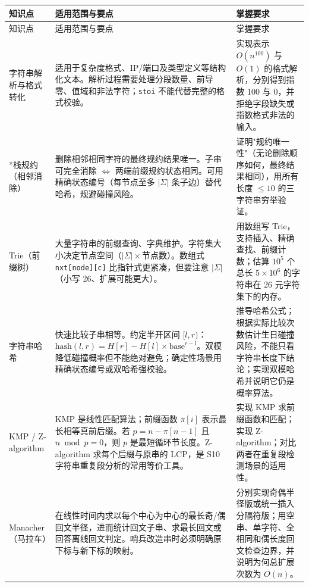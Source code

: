 \documentclass[a4paper,11pt]{article}
\newcommand{\code}[1]{\texttt{#1}}
\begin{document}
\begin{longtable}{L{2.4cm} L{7.5cm} L{6.8cm}}
\toprule
知识点 & 适用范围与要点 & 掌握要求 \\
\midrule
\endfirsthead
\toprule
知识点 & 适用范围与要点 & 掌握要求 \\
\midrule
\endhead
\endfoot
\bottomrule
\endlastfoot

字符串解析与格式转化
& 适用于复杂度格式、IP/端口及类型定义等结构化文本。解析过程需要处理分段数量、前导零、值域和非法字符；\code{stoi} 不能代替完整的格式校验。
& 实现表示 $O(n^{100})$ 与 $O(1)$ 的格式解析，分别得到指数 100 与 0，并拒绝字段缺失或指数格式非法的输入。\\[2mm]

*栈规约（相邻消除）
& 删除相邻相同字符的最终规约结果唯一。子串可完全消除 $\iff$ 两端前缀规约状态相同。可用精确状态编号（每节点至多 $|\Sigma|$ 条子边）替代哈希，规避碰撞风险。
& 证明"规约唯一性"（无论删除顺序如何，最终结果相同），用所有长度 $\le10$ 的三字符串穷举验证。\\[2mm]

Trie（前缀树）
& 大量字符串的前缀查询、字典维护。字符集大小决定节点空间（$|\Sigma|\times$节点数）。数组式 \code{nxt[node][c]} 比指针式更紧凑，但要注意 $|\Sigma|$（小写 26、扩展可能更大）。
& 用数组写 Trie，支持插入、精确查找、前缀计数；估算 $10^5$ 个总长 $5\times10^6$ 的字符串在 26 元字符集下的内存。\\[2mm]

字符串哈希
& 快速比较子串相等。约定半开区间 $[l,r)$：$\text{hash}(l,r)=H[r]-H[l]\times\text{base}^{r-l}$。双模降低碰撞概率但不能绝对避免；确定性场景用精确状态编号或双哈希强校验。
& 推导哈希公式；根据实际比较次数估计生日碰撞风险，不能只看字符串长度下结论；实现双模哈希并说明它仍是概率算法。\\[2mm]

KMP / Z-algorithm
& KMP 是线性匹配算法；前缀函数 $\pi[i]$ 表示最长相等真前后缀。若 $p=n-\pi[n-1]$ 且 $n\bmod p=0$，则 $p$ 是最短循环节长度。Z-algorithm 求每个后缀与原串的 LCP，是 S10 字符串重复段分析的常用等价工具。
& 实现 KMP 求前缀函数和匹配；实现 Z-algorithm；对比两者在重复段检测场景的适用性。\\[2mm]

Manacher（马拉车）
& 在线性时间内求以每个中心为中心的最长奇/偶回文半径，进而统计回文子串、求最长回文或回答离线回文判定。哨兵改造串时必须明确原下标与新下标的映射。
& 分别实现奇偶半径版或统一插入分隔符版；用空串、单字符、全相同和偶长度回文检查边界，并说明为何总扩展次数为 $O(n)$。\\[2mm]


\end{longtable}
\end{document}

